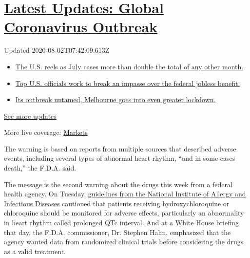 \hypertarget{latest-updates-global-coronavirus-outbreak}{%
\section{\texorpdfstring{\href{https://www.nytimes3xbfgragh.onion/2020/08/01/world/coronavirus-covid-19.html?action=click\&pgtype=Article\&state=default\&region=MAIN_CONTENT_1\&context=storylines_live_updates}{Latest
Updates: Global Coronavirus
Outbreak}}{Latest Updates: Global Coronavirus Outbreak}}\label{latest-updates-global-coronavirus-outbreak}}

Updated 2020-08-02T07:42:09.613Z

\begin{itemize}
\tightlist
\item
  \href{https://www.nytimes3xbfgragh.onion/2020/08/01/world/coronavirus-covid-19.html?action=click\&pgtype=Article\&state=default\&region=MAIN_CONTENT_1\&context=storylines_live_updates\#link-34047410}{The
  U.S. reels as July cases more than double the total of any other
  month.}
\item
  \href{https://www.nytimes3xbfgragh.onion/2020/08/01/world/coronavirus-covid-19.html?action=click\&pgtype=Article\&state=default\&region=MAIN_CONTENT_1\&context=storylines_live_updates\#link-780ec966}{Top
  U.S. officials work to break an impasse over the federal jobless
  benefit.}
\item
  \href{https://www.nytimes3xbfgragh.onion/2020/08/01/world/coronavirus-covid-19.html?action=click\&pgtype=Article\&state=default\&region=MAIN_CONTENT_1\&context=storylines_live_updates\#link-2bc8948}{Its
  outbreak untamed, Melbourne goes into even greater lockdown.}
\end{itemize}

\href{https://www.nytimes3xbfgragh.onion/2020/08/01/world/coronavirus-covid-19.html?action=click\&pgtype=Article\&state=default\&region=MAIN_CONTENT_1\&context=storylines_live_updates}{See
more updates}

More live coverage:
\href{https://www.nytimes3xbfgragh.onion/live/2020/07/31/business/stock-market-today-coronavirus?action=click\&pgtype=Article\&state=default\&region=MAIN_CONTENT_1\&context=storylines_live_updates}{Markets}

The warning is based on reports from multiple sources that described
adverse events, including several types of abnormal heart rhythm, ``and
in some cases death,'' the F.D.A. said.

The message is the second warning about the drugs this week from a
federal health agency. On Tuesday,
\href{https://www.nytimes3xbfgragh.onion/2020/04/21/health/nih-covid-19-treatment.html?searchResultPosition=1}{guidelines
from the National Institute of Allergy and Infectious Diseases}
cautioned that patients receiving hydroxychloroquine or chloroquine
should be monitored for adverse effects, particularly an abnormality in
heart rhythm called prolonged QTc interval. And at a White House
briefing that day, the F.D.A. commissioner, Dr. Stephen Hahn, emphasized
that the agency wanted data from randomized clinical trials before
considering the drugs as a valid treatment.

